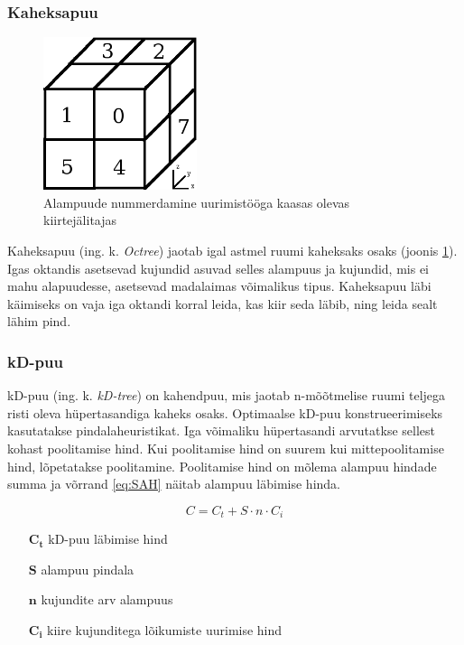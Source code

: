 \documentclass[a4paper,12pt]{report}
\begin{document}
\subsubsection{Kaheksapuu}
\begin{figure}
\includegraphics[width=0.4\textwidth]{octree}
\caption{Alampuude nummerdamine uurimistööga kaasas olevas kiirtejälitajas}
\label{fig:octree}
\end{figure}
Kaheksapuu (ing. k. \textit{Octree}) jaotab igal astmel ruumi kaheksaks
osaks (joonis \ref{fig:octree}). Igas oktandis asetsevad kujundid asuvad selles alampuus ja kujundid,
mis ei mahu alapuudesse, asetsevad madalaimas võimalikus tipus. Kaheksapuu
läbi käimiseks on vaja iga oktandi korral leida, kas kiir seda läbib, ning
leida sealt lähim pind.

\subsubsection{kD-puu}
kD-puu (ing. k. \textit{kD-tree}) on kahendpuu, mis jaotab n-mõõtmelise
ruumi teljega risti oleva hüpertasandiga kaheks osaks. Optimaalse kD-puu
konstrueerimiseks kasutatakse pindalaheuristikat. Iga võimaliku hüpertasandi
arvutatkse sellest kohast poolitamise hind. Kui poolitamise hind on suurem
kui mittepoolitamise hind, lõpetatakse poolitamine. Poolitamise hind on
mõlema alampuu hindade summa ja võrrand \ref{eq:SAH} näitab alampuu 
läbimise hinda.

\begin{equation} \label{eq:SAH}
C = C_t + S \cdot n \cdot C_i
\end{equation}
\begin{itemize}
\item[\(\mathbf{C_t}\)] kD-puu läbimise hind
\item[\(\mathbf{S}\)] alampuu pindala
\item[\(\mathbf{n}\)] kujundite arv alampuus
\item[\(\mathbf{C_i}\)] kiire kujunditega lõikumiste uurimise hind
\end{itemize}
\end{document}
